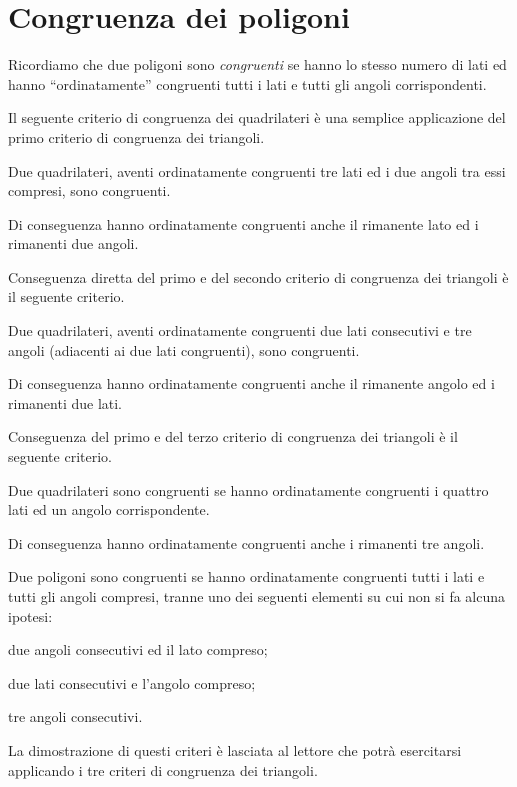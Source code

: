 \section{Congruenza dei poligoni}

Ricordiamo che due poligoni sono \emph{congruenti} se hanno lo stesso numero di lati ed hanno ``ordinatamente'' congruenti tutti i lati e tutti gli angoli corrispondenti.

Il seguente criterio di congruenza dei quadrilateri è una semplice applicazione del primo criterio di congruenza dei triangoli.
\begin{teorema}
Due quadrilateri, aventi ordinatamente congruenti tre lati ed i due angoli tra essi compresi, sono congruenti.
\end{teorema}
Di conseguenza hanno ordinatamente congruenti anche il rimanente lato ed i rimanenti due angoli.

Conseguenza diretta del primo e del secondo criterio di congruenza dei triangoli è il seguente criterio.
\begin{teorema}
Due quadrilateri, aventi ordinatamente congruenti due lati consecutivi e tre angoli (adiacenti ai due lati congruenti), sono congruenti.
\end{teorema}
Di conseguenza hanno ordinatamente congruenti anche il rimanente angolo ed i rimanenti due lati.

Conseguenza del primo e del terzo criterio di congruenza dei triangoli è il seguente criterio.
\begin{teorema}
Due quadrilateri sono congruenti se hanno ordinatamente congruenti i quattro lati ed un angolo corrispondente.
\end{teorema}
Di conseguenza hanno ordinatamente congruenti anche i rimanenti tre angoli.

\begin{teorema}
Due poligoni sono congruenti se hanno ordinatamente congruenti tutti i lati e tutti gli angoli compresi, tranne uno dei seguenti elementi su cui non si fa alcuna ipotesi:
\begin{itemize*}
\item due angoli consecutivi ed il lato compreso;
\item due lati consecutivi e l'angolo compreso;
\item tre angoli consecutivi.
\end{itemize*}
\end{teorema}

La dimostrazione di questi criteri è lasciata al lettore che potrà esercitarsi applicando i tre criteri di congruenza dei triangoli.


\newpage



\cleardoublepage
